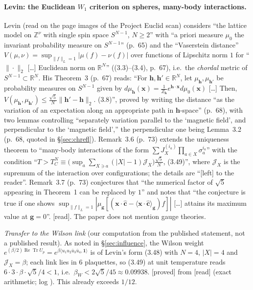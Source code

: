 \documentclass[11pt,a4paper]{article}
\theoremstyle{remark}
\theoremstyle{definition}
\theoremstyle{plain}
\theoremstyle{remark}
\newcommand{\R}{\mathbb{R}}
\newcommand{\Z}{\mathbb{Z}}
\newcommand{\ReTr}{\operatorname{Re}\operatorname{Tr}}
\newcommand{\st}[1]{\textsf{[#1]}}
\begin{document}
\paragraph{Levin: the Euclidean $W_1$ criterion on spheres, many-body interactions.} Levin \cite{Lev80}
(read on the page images of the Project Euclid scan) considers ``the lattice model on $\Z^\nu$ with single
spin space $S^{N-1}$, $N\geqslant2$'' with ``a priori measure $\mu_0$ the invariant probability measure on
$S^{N-1}$'' (p.~65) and the ``Vaserstein distance'' $V(\mu,\nu)=\sup_{\|f\|_L=1}|\mu(f)-\nu(f)|$ over
functions of Lipschitz norm $1$ for ``$\|\cdot\|_2$ [\ldots] Euclidean norm on $\R^N$'' ((3.3)--(3.4), p.~67),
i.e.\ the \emph{chordal} metric of $S^{N-1}\subset\R^N$. His Theorem~3 (p.~67) reads: ``For $\mathbf h,\mathbf h'\in\R^N$,
let $\mu_{\mathbf h},\mu_{\mathbf h'}$ be probability measures on $S^{N-1}$ given by
$d\mu_{\mathbf h}(\mathbf x)=\frac1{Z_{\mathbf h}}e^{\mathbf h\cdot\mathbf x}d\mu_0(\mathbf x)$ [\ldots] Then,
$V(\mu_{\mathbf h},\mu_{\mathbf h'})\leqslant\frac{\sqrt5}{N}\|\mathbf h'-\mathbf h\|_2$. (3.8)'', proved by writing the
distance ``as the variation of an expectation along an appropriate path in $\mathbf h$-space'' (p.~68), with two
lemmas controlling ``separately variation parallel to the `magnetic field', and perpendicular to the `magnetic
field','' the perpendicular one being Lemma~3.2 (p.~68, quoted in \S\ref{sec:chrefl}). Remark~3.6 (p.~73) extends
the uniqueness theorem to ``many-body interactions of the
form $\sum J_X^{(i_a)}\prod_{a\in X}\sigma_a^{i_a}$'' with the condition
``$T>T_C^N\equiv\big(\sup_{a}\sum_{X\ni a}(|X|-1)\mathscr J_X\big)\frac{\sqrt5}{N}$, (3.49)'', where $\mathscr J_X$ is the
supremum of the interaction over configurations; the details are ``[left] to the reader''. Remark~3.7 (p.~73)
conjectures that ``the numerical factor of $\sqrt5$ appearing in Theorem~1 can be replaced by $1$'' and notes that
``the conjecture is true if one shows $\sup_{\|f\|_L=1}|\mu_{\mathbf g}[(\mathbf x\cdot\hat{\mathbf c}-\langle\mathbf x\cdot\hat{\mathbf c}\rangle_{\mathbf g})f]|$ [\ldots]
attains its maximum value at $\mathbf g=0$''. \st{read}. The paper does not mention gauge theories.

\emph{Transfer to the Wilson link} (our computation from the published statement, not a published
result). As noted in \S\ref{sec:influence}, the Wilson weight $e^{(\beta/2)\ReTr U_p}=e^{\beta\langle u_1u_2\bar u_3\bar u_4,\mathbf 1\rangle}$
is of Levin's form (3.48) with $N=4$, $|X|=4$ and $\mathscr J_X=\beta$; each link lies in $6$ plaquettes, so (3.49)
at unit temperature reads $6\cdot3\cdot\beta\cdot\sqrt5/4<1$, i.e.\ $\beta_W<2\sqrt5/45\approx0.09938$.
\st{proved} from \st{read} (exact arithmetic; log ).
This already exceeds $1/12$.
\end{document}
